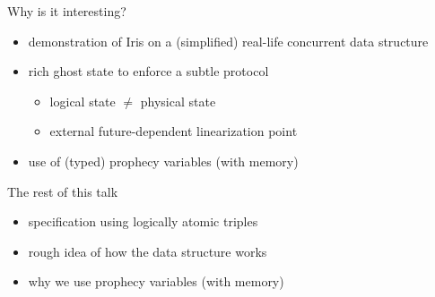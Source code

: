 \begin{frame}{Why is it interesting?}
\begin{itemize}
	\item demonstration of Iris on a (simplified) real-life concurrent data structure
	\item rich ghost state to enforce a subtle protocol
		\begin{itemize}
			\item logical state $\neq$ physical state
			\item external future-dependent linearization point
		\end{itemize}
	\item use of (typed) prophecy variables (with memory)
\end{itemize}
\end{frame}

\begin{frame}{The rest of this talk}
\begin{itemize}
	\item specification using logically atomic triples
	\item rough idea of how the data structure works
	\item why we use prophecy variables (with memory)
\end{itemize}
\end{frame}
